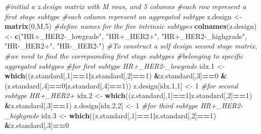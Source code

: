 \documentclass[11pt,]{article}
\newenvironment{Shaded}{\begin{snugshade}}{\end{snugshade}}
\newcommand{\CommentTok}[1]{\textcolor[rgb]{0.56,0.35,0.01}{\textit{#1}}}
\newcommand{\DecValTok}[1]{\textcolor[rgb]{0.00,0.00,0.81}{#1}}
\newcommand{\FloatTok}[1]{\textcolor[rgb]{0.00,0.00,0.81}{#1}}
\newcommand{\KeywordTok}[1]{\textcolor[rgb]{0.13,0.29,0.53}{\textbf{#1}}}
\newcommand{\NormalTok}[1]{#1}
\newcommand{\OperatorTok}[1]{\textcolor[rgb]{0.81,0.36,0.00}{\textbf{#1}}}
\newcommand{\StringTok}[1]{\textcolor[rgb]{0.31,0.60,0.02}{#1}}
\begin{document}
\begin{Shaded}
\begin{Highlighting}[]
\CommentTok{#initial a z.design matrix with M rows, and 5 columns}
\CommentTok{#each row represent a first stage subtype}
\CommentTok{#each column represent an aggregated subtype}
\NormalTok{z.design <-}\StringTok{ }\KeywordTok{matrix}\NormalTok{(}\DecValTok{0}\NormalTok{,M,}\DecValTok{5}\NormalTok{)}
\CommentTok{#define names for the five intrinsic subtypes}
\KeywordTok{colnames}\NormalTok{(z.design) <-}\StringTok{ }\KeywordTok{c}\NormalTok{(}\StringTok{"HR+_HER2-_lowgrade"}\NormalTok{,}
                        \StringTok{"HR+_HER2+"}\NormalTok{,}
                        \StringTok{"HR+_HER2-_highgrade"}\NormalTok{,}
                        \StringTok{"HR-_HER2+"}\NormalTok{, }
                        \StringTok{"HR-_HER2-"}\NormalTok{)}
\CommentTok{#To construct a self design second stage matrix,}
\CommentTok{#we need to find the correpsonding first stage subtypes}
\CommentTok{#belonging to specific aggregated subtypes}
\CommentTok{#for first subtype HR+_HER2-_lowgrade}
\NormalTok{idx}\FloatTok{.1}\NormalTok{ <-}\StringTok{ }\KeywordTok{which}\NormalTok{((z.standard[,}\DecValTok{1}\NormalTok{]}\OperatorTok{==}\DecValTok{1}\OperatorTok{|}\NormalTok{z.standard[,}\DecValTok{2}\NormalTok{]}\OperatorTok{==}\DecValTok{1}\NormalTok{)}
               \OperatorTok{&}\NormalTok{z.standard[,}\DecValTok{3}\NormalTok{]}\OperatorTok{==}\DecValTok{0}
               \OperatorTok{&}\NormalTok{(z.standard[,}\DecValTok{4}\NormalTok{]}\OperatorTok{==}\DecValTok{0}\OperatorTok{|}\NormalTok{z.standard[,}\DecValTok{4}\NormalTok{]}\OperatorTok{==}\DecValTok{1}\NormalTok{))}
\NormalTok{z.design[idx}\FloatTok{.1}\NormalTok{,}\DecValTok{1}\NormalTok{] <-}\StringTok{ }\DecValTok{1}
\CommentTok{#for second subtype HR+_HER2+}
\NormalTok{idx}\FloatTok{.2}\NormalTok{ <-}\StringTok{ }\KeywordTok{which}\NormalTok{((z.standard[,}\DecValTok{1}\NormalTok{]}\OperatorTok{==}\DecValTok{1}\OperatorTok{|}\NormalTok{z.standard[,}\DecValTok{2}\NormalTok{]}\OperatorTok{==}\DecValTok{1}\NormalTok{)}
               \OperatorTok{&}\NormalTok{z.standard[,}\DecValTok{3}\NormalTok{]}\OperatorTok{==}\DecValTok{1}\NormalTok{)}
\NormalTok{z.design[idx}\FloatTok{.2}\NormalTok{,}\DecValTok{2}\NormalTok{] <-}\StringTok{ }\DecValTok{1}
\CommentTok{#for third subtype HR+_HER2-_highgrade}
\NormalTok{idx}\FloatTok{.3}\NormalTok{ <-}\StringTok{ }\KeywordTok{which}\NormalTok{((z.standard[,}\DecValTok{1}\NormalTok{]}\OperatorTok{==}\DecValTok{1}\OperatorTok{|}\NormalTok{z.standard[,}\DecValTok{2}\NormalTok{]}\OperatorTok{==}\DecValTok{1}\NormalTok{)}
               \OperatorTok{&}\NormalTok{z.standard[,}\DecValTok{3}\NormalTok{]}\OperatorTok{==}\DecValTok{0}

\end{Highlighting}
\end{Shaded}
\end{document}
